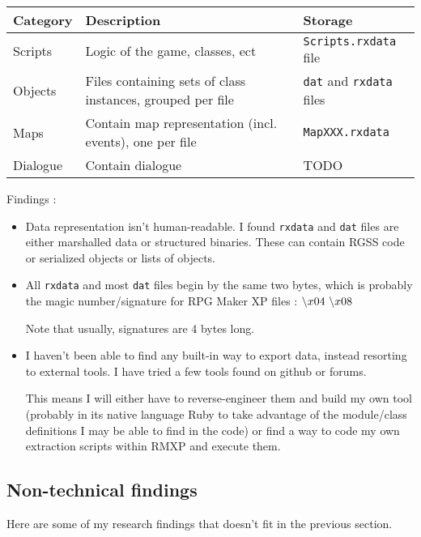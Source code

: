 \documentclass[11pt]{article}
\newcommand\BS{\char`\\}
\begin{document}
\begin{tabular}{|L{.1\textwidth}|L{.52\textwidth}|L{.3\textwidth}|}
	\hline
	\textbf{Category} & \textbf{Description} & \textbf{Storage} \\
	\hline
	Scripts & Logic of the game, classes, ect & \verb|Scripts.rxdata| file \\
	\hline
	Objects & Files containing sets of class instances, grouped per file & \verb|dat| and \verb|rxdata| files \\
	\hline
	Maps & Contain map representation (incl. events), one per file & \verb|MapXXX.rxdata| \\
	\hline
	Dialogue & Contain dialogue & TODO \\
	\hline
\end{tabular}

Findings :
\begin{itemize}
	\item Data representation isn't human-readable. I found \verb|rxdata| and \verb|dat| files are either marshalled data or structured binaries. These can contain RGSS code or serialized objects or lists of objects.
	
	\item All \verb|rxdata| and most \verb|dat| files begin by the same two bytes, which is probably the magic number/signature for RPG Maker XP files : $\BS x04 \ \BS x08$
	
	Note that usually, signatures are 4 bytes long.
	
	\item I haven't been able to find any built-in way to export data, instead resorting to external tools. I have tried a few tools found on github or forums. %
	
	This means I will either have to reverse-engineer them and build my own tool (probably in its native language Ruby to take advantage of the module/class definitions I may be able to find in the code) or find a way to code my own extraction scripts within RMXP and execute them.
\end{itemize}



\subsection{Non-technical findings}

Here are some of my research findings that doesn't fit in the previous section. 
\end{document}
